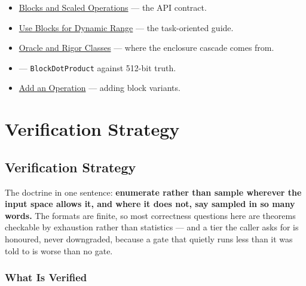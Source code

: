 \begin{itemize}
\item \href{reference\_\allowbreak{}arrays\_\allowbreak{}blocks\_\allowbreak{}storage.md}{Blocks and Scaled Operations} — the API contract.


\item \href{workflow\_\allowbreak{}blocks.md}{Use Blocks for Dynamic Range} — the task-oriented guide.


\item \href{internals\_\allowbreak{}oracle.md}{Oracle and Rigor Classes} — where the enclosure cascade comes from.


\item {} — \texttt{BlockDotProduct} against 512-bit truth.


\item \href{internals\_\allowbreak{}add\_\allowbreak{}operation.md}{Add an Operation} — adding block variants.

\end{itemize}


\chapter{Verification Strategy}


\section{Verification Strategy}



\label{1597188585439542267}{}


The doctrine in one sentence: \textbf{enumerate rather than sample wherever the input space allows it, and where it does not, say {\textquotedbl}sampled{\textquotedbl} in so many words.} The formats are finite, so most correctness questions here are theorems checkable by exhaustion rather than statistics — and a tier the caller asks for is honoured, never downgraded, because a gate that quietly runs less than it was told to is worse than no gate.



\subsection{What Is Verified}



\label{15691574599836510193}{}


